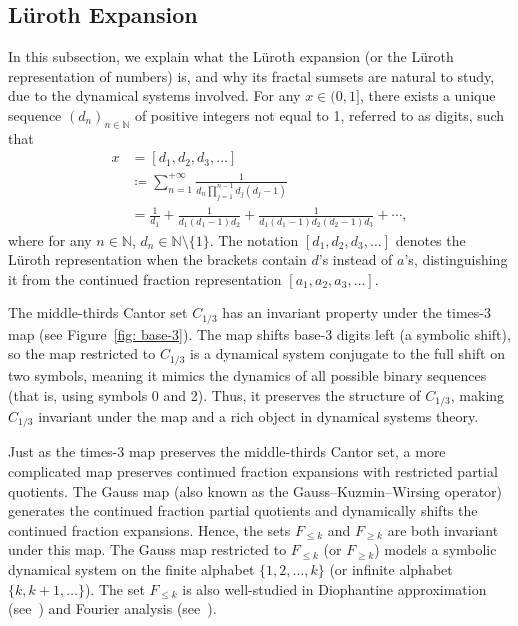 \documentclass{ws-ijnt}
\begin{document}
	\subsection{L\"uroth Expansion}\label{subsectle}
	In this subsection, we explain what the L\"uroth expansion (or the L\"uroth representation of numbers) is, and why its fractal sumsets are natural to study, due to the dynamical systems involved. For any $x\in(0,1]$, there exists a unique sequence $(d_n)_{n\in\mathbb{N}}$ of positive integers not equal to 1, referred to as digits, such that 
	\begin{align*}
		x
		&= [d_1, d_2, d_3, \dots] \\
		&\coloneqq\sum_{n=1}^{+\infty}\frac{1}{d_n\prod_{j=1}^{n-1}d_j(d_j-1)} \\
		&=\frac{1}{d_1}+\frac{1}{d_1(d_1-1)d_2}+\frac{1}{d_1(d_1-1)d_2(d_2-1)d_3}+\cdots,
	\end{align*}
	where for any $n\in\mathbb{N}$, $d_n\in\mathbb{N}\setminus\{1\}$. The notation $[d_1, d_2, d_3,\ldots]$ denotes the L\"uroth representation when the brackets contain $d$'s instead of $a$'s, distinguishing it from the continued fraction representation $[a_1, a_2, a_3, \ldots]$.
	
	The middle-thirds Cantor set $C_{1/3}$ has an invariant property under the times-3 map (see Figure~\ref{fig: base-3}). The map shifts base-3 digits left (a symbolic shift), so the map restricted to $C_{1/3}$ is a dynamical system conjugate to the full shift on two symbols, meaning it mimics the dynamics of all possible binary sequences (that is, using symbols 0 and 2). Thus, it preserves the structure of $C_{1/3}$, making $C_{1/3}$ invariant under the map and a rich object in dynamical systems theory.
	
	Just as the times-3 map preserves the middle-thirds Cantor set, a more complicated map preserves continued fraction expansions with restricted partial quotients. The Gauss map (also known as the Gauss--Kuzmin--Wirsing operator) generates the continued fraction partial quotients and dynamically shifts the continued fraction expansions. Hence, the sets $F_{\leq k}$ and $F_{\geq k}$ are both invariant under this map. The Gauss map restricted to $F_{\leq k}$ (or $F_{\geq k}$) models a symbolic dynamical system on the finite alphabet $\{1, 2, \ldots, k\}$ (or infinite alphabet $\{k, k+1, \ldots\}$). The set $F_{\leq k}$ is also well-studied in Diophantine approximation (see~\cite[Theorem 1.4]{beresnevich2016metricdiophantineapproximationaspects}) and Fourier analysis (see~\cite{kaufman1980continued,queffelec2003analyse,sahlsten2024fourier}).
	
\end{document}
